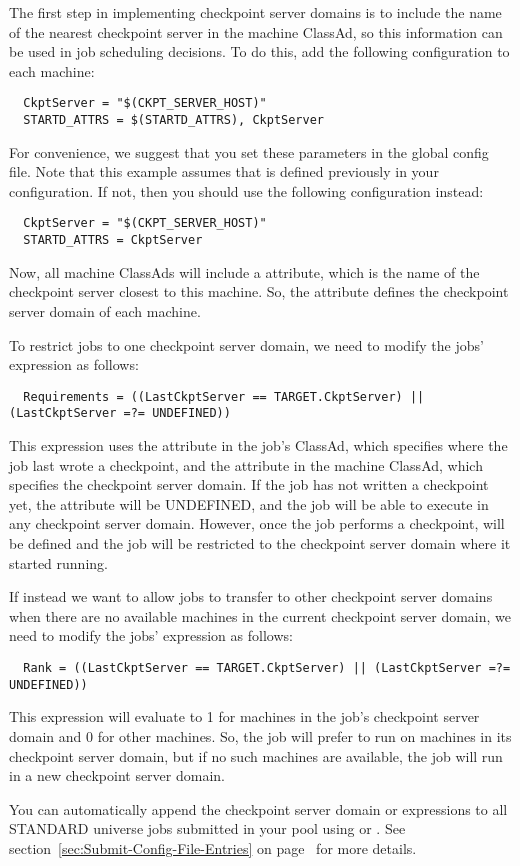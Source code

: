 The first step in implementing checkpoint server domains is to include
the name of the nearest checkpoint server in the machine
ClassAd, so this information can be used in job scheduling decisions.
To do this, add the following configuration to each machine:
\begin{verbatim}
  CkptServer = "$(CKPT_SERVER_HOST)"
  STARTD_ATTRS = $(STARTD_ATTRS), CkptServer
\end{verbatim}
For convenience, we suggest that you set these parameters in the
global config file.  Note that this example assumes that
 is defined previously in your configuration.  If
not, then you should use the following configuration instead:
\begin{verbatim}
  CkptServer = "$(CKPT_SERVER_HOST)"
  STARTD_ATTRS = CkptServer
\end{verbatim}
Now, all machine ClassAds will include a 
attribute, which is the name of the checkpoint server closest to this
machine.  So, the  attribute defines the checkpoint
server domain of each machine.

To restrict jobs to one checkpoint server domain, we need to modify
the jobs'  expression as follows:
\begin{verbatim}
  Requirements = ((LastCkptServer == TARGET.CkptServer) || (LastCkptServer =?= UNDEFINED))
\end{verbatim}
This  expression uses the 
attribute in the job's ClassAd, which specifies where the job last
wrote a checkpoint, and the  attribute in the
machine ClassAd, which specifies the checkpoint server domain.  If the
job has not written a checkpoint yet, the 
attribute will be UNDEFINED, and the job will be able to execute in
any checkpoint server domain.  However, once the job performs a
checkpoint,
 will be defined and the job will be restricted to the
checkpoint server domain where it started running.

If instead we want to allow jobs to transfer to other checkpoint
server domains when there are no available machines in the current
checkpoint server domain, we need to modify the jobs'  expression
as follows:
\begin{verbatim}
  Rank = ((LastCkptServer == TARGET.CkptServer) || (LastCkptServer =?= UNDEFINED))
\end{verbatim}
This  expression will evaluate to 1 for machines in the
job's checkpoint server domain and 0 for other machines.  So, the job
will prefer to run on machines in its checkpoint server domain, but if
no such machines are available, the job will run in a new checkpoint
server domain.

You can automatically append the checkpoint server domain
 or  expressions to all STANDARD
universe jobs submitted in your pool using
 or .
See section~\ref{sec:Submit-Config-File-Entries} on
page~\pageref{sec:Submit-Config-File-Entries} for more details.
